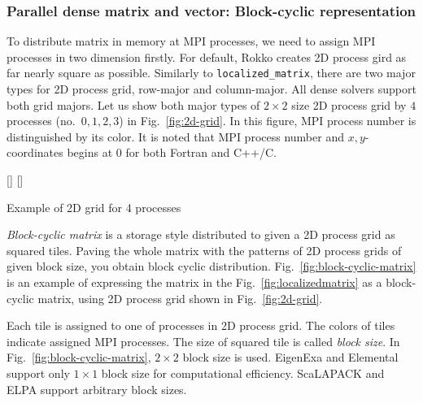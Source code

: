 \documentclass[12pt]{article}
\newcommand\figref[1]{Fig.~\ref{#1}}
\begin{document}
\subsubsection{Parallel dense matrix and vector: Block-cyclic representation}
\label{subsubsec:rep-block-cyclic}
To distribute matrix in memory at MPI processes, we need to assign MPI processes in two dimension firstly.
For default, Rokko creates 2D process gird as far nearly square as possible.
Similarly to \texttt{localized\_matrix}, there are two major types for 2D process grid, row-major and column-major.
All dense solvers support both grid majors.
Let us show both major types of $2\times 2$ size 2D process grid by $4$ processes (no.\ $0,1,2,3$) in \figref{fig:2d-grid}.
In this figure, MPI process number is distinguished by its color.
It is noted that MPI process number and $x, y$-coordinates begins at $0$ for both Fortran and C++/C.

\noindent\begin{minipage}{\linewidth}
  \centering
  [\widthof{\drawgridrowmajor}]{\drawgridrowmajor}
  [\widthof{\drawgridcolmajor}]{\drawgridcolmajor}
\caption{Example of 2D grid for 4 processes}\label{fig:2d-grid}
\end{minipage}

\emph{Block-cyclic matrix} is a storage style distributed to given a 2D process grid as squared tiles. 
Paving the whole matrix with the patterns of 2D process grids of given block size, you obtain block cyclic distribution.
\figref{fig:block-cyclic-matrix} is an example of expressing the matrix in the \figref{fig:localizedmatrix} as a block-cyclic matrix,
using 2D process grid shown in \figref{fig:2d-grid}.

Each tile is assigned to one of processes in 2D process grid.
The colors of tiles indicate assigned MPI processes.
The size of squared tile is called \emph{block size}.
In \figref{fig:block-cyclic-matrix}, $2\times2$ block size is used.
EigenExa and Elemental support only $1\times1$ block size for computational efficiency.
ScaLAPACK and ELPA support arbitrary block sizes.
\end{document}
